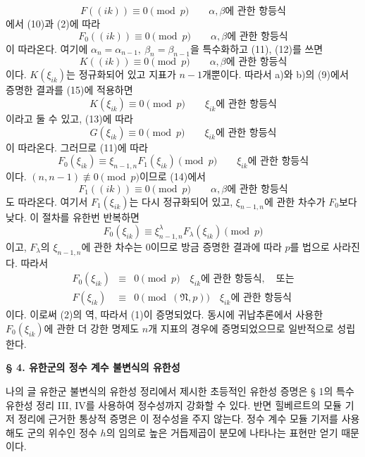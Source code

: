 \[
F((ik))\equiv0\pmod p
\qquad\text{\(\alpha,\beta\)에 관한 항등식}
\]
에서 (10)과 (2)에 따라
\begin{equation}
\tag{14}
F_0((ik))\equiv0\pmod p
\qquad\text{\(\alpha,\beta\)에 관한 항등식}
\end{equation}
이 따라온다. 여기에 \(\alpha_n=\alpha_{n-1},\ \beta_n=\beta_{n-1}\)을 특수화하고 (11), (12)를 쓰면
\begin{equation}
\tag{15}
K((ik))\equiv0\pmod p
\qquad\text{\(\alpha,\beta\)에 관한 항등식}
\end{equation}
이다. \(K(\xi_{ik})\)는 정규화되어 있고 지표가 \(n-1\)개뿐이다. 따라서 a)와 b)의 (9)에서 증명한 결과를 (15)에 적용하면
\[
K(\xi_{ik})\equiv0\pmod p
\qquad\text{\(\xi_{ik}\)에 관한 항등식}
\]
이라고 둘 수 있고, (13)에 따라
\[
G(\xi_{ik})\equiv0\pmod p
\qquad\text{\(\xi_{ik}\)에 관한 항등식}
\]
이 따라온다. 그러므로 (11)에 따라
\[
F_0(\xi_{ik})\equiv\xi_{n-1,n}F_1(\xi_{ik})\pmod p
\qquad\text{\(\xi_{ik}\)에 관한 항등식}
\]
이다. \((n,n-1)\not\equiv0\pmod p\)이므로 (14)에서
\[
F_1((ik))\equiv0\pmod p
\qquad\text{\(\alpha,\beta\)에 관한 항등식}
\]
도 따라온다. 여기서 \(F_1(\xi_{ik})\)는 다시 정규화되어 있고, \(\xi_{n-1,n}\)에 관한 차수가 \(F_0\)보다 낮다. 이 절차를 유한번 반복하면
\[
F_0(\xi_{ik})\equiv\xi_{n-1,n}^{\lambda}F_\lambda(\xi_{ik})\pmod p
\]
이고, \(F_\lambda\)의 \(\xi_{n-1,n}\)에 관한 차수는 0이므로 방금 증명한 결과에 따라 \(p\)를 법으로 사라진다. 따라서
\begin{equation}
\tag{16}
\begin{array}{rcl}
F_0(\xi_{ik})&\equiv&0\pmod p
\quad\text{\(\xi_{ik}\)에 관한 항등식},\quad\text{또는}\\
F(\xi_{ik})&\equiv&0\pmod{(\mathfrak N,p)}
\quad\text{\(\xi_{ik}\)에 관한 항등식}
\end{array}
\end{equation}
이다. 이로써 (2)의 역, 따라서 (1)이 증명되었다. 동시에 귀납추론에서 사용한 \(F_0(\xi_{ik})\)에 관한 더 강한 명제도 \(n\)개 지표의 경우에 증명되었으므로 일반적으로 성립한다.

\bigskip
\begin{center}
\textbf{§ 4. 유한군의 정수 계수 불변식의 유한성}
\end{center}

나의 글 \glqq{}유한군 불변식의 유한성 정리\grqq{}에서 제시한 초등적인 유한성 증명은 § 1의 특수 유한성 정리 III, IV를 사용하여 정수성까지 강화할 수 있다. 반면 힐베르트의 모듈 기저 정리에 근거한 통상적 증명은 이 정수성을 주지 않는다. 정수 계수 모듈 기저를 사용해도 군의 위수인 정수 \(h\)의 임의로 높은 거듭제곱이 분모에 나타나는 표현만 얻기 때문이다.

